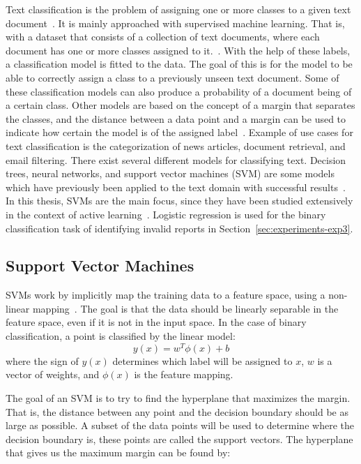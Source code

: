 Text classification is the problem of assigning one or more classes to a given text document~\cite{aggarwal2012surveyclass}.
It is mainly approached with supervised machine learning.
That is, with a dataset that consists of a collection of text documents, where each document has one or more classes assigned to it.~\cite{bishop2006pattern}.
With the help of these labels, a classification model is fitted to the data.
The goal of this is for the model to be able to correctly assign a class to a previously unseen text document.
Some of these classification models can also produce a probability of a document being of a certain class.
Other models are based on the concept of a margin that separates the classes, and the distance between a data point and a margin can be used to indicate how certain the model is of the assigned label~\cite{tong2001support}.
Example of use cases for text classification is the categorization of news articles, document retrieval, and email filtering.
There exist several different models for classifying text.
Decision trees, neural networks, and support vector machines (SVM) are some models which have previously been applied to the text domain with successful results~\cite{aggarwal2012surveyclass}.
In this thesis, SVMs are the main focus, since they have been studied extensively in the context of active learning~\cite{tong2001support, settles2012active, brinker2006active, yang2009effective}.
Logistic regression is used for the binary classification task of identifying invalid reports in Section~\ref{sec:experiments-exp3}.

\subsection{Support Vector Machines}

SVMs work by implicitly map the training data to a feature space, using a non-linear mapping~\cite{bishop2006pattern}.
The goal is that the data should be linearly separable in the feature space, even if it is not in the input space.
In the case of binary classification, a point is classified by the linear model:
\begin{equation}\label{eq:svm-y}
    y(x) = w^T \phi(x) + b
\end{equation}
where the sign of $y(x)$ determines which label will be assigned to $x$, $w$ is a vector of weights, and $\phi(x)$ is the feature mapping.

The goal of an SVM is to try to find the hyperplane that maximizes the margin.
That is, the distance between any point and the decision boundary should be as large as possible.
A subset of the data points will be used to determine where the decision boundary is, these points are called the support vectors.
The hyperplane that gives us the maximum margin can be found by:


